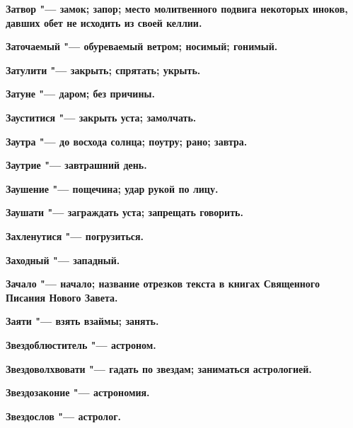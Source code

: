 \bfseries Затвор \normalfont{} "--- замок; запор; место молитвенного подвига некоторых иноков, давших обет не исходить из своей келлии. 




\bfseries Заточаемый \normalfont{} "--- обуреваемый ветром; носимый; гонимый. 




\bfseries Затулити \normalfont{} "--- закрыть; спрятать; укрыть. 




\bfseries Затуне \normalfont{} "--- даром; без причины. 




\bfseries Зауститися \normalfont{} "--- закрыть уста; замолчать. 




\bfseries Заутра \normalfont{} "--- до восхода солнца; поутру; рано; завтра. 




\bfseries Заутрие \normalfont{} "--- завтрашний день. 




\bfseries Заушение \normalfont{} "--- пощечина; удар рукой по лицу. 




\bfseries Заушати \normalfont{} "--- заграждать уста; запрещать говорить. 




\bfseries Захленутися \normalfont{} "--- погрузиться. 




\bfseries Заходный \normalfont{} "--- западный. 




\bfseries Зачало \normalfont{} "--- начало; название отрезков текста в книгах Священного Писания Нового Завета. 




\bfseries Заяти \normalfont{} "--- взять взаймы; занять. 




\bfseries Звездоблюститель \normalfont{} "--- астроном. 




\bfseries Звездоволхвовати \normalfont{} "--- гадать по звездам; заниматься астрологией. 




\bfseries Звездозаконие \normalfont{} "--- астрономия. 




\bfseries Звездослов \normalfont{} "--- астролог. 




